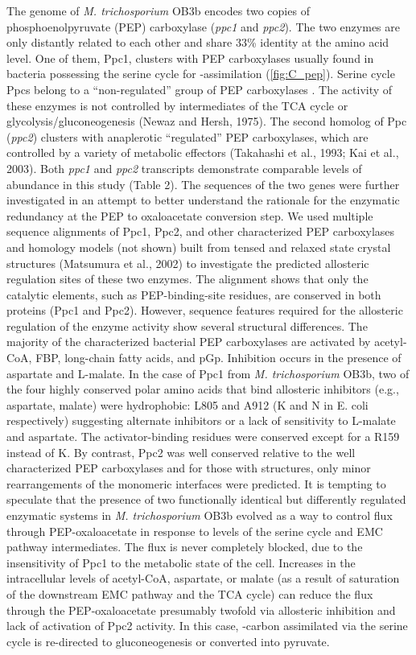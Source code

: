 The genome of \textit{M. trichosporium} OB3b encodes two copies of phosphoenolpyruvate (PEP) carboxylase (\textit{ppc1} and \textit{ppc2}).
The two enzymes are only distantly related to each other and share 33\% identity at the amino acid level.
One of them, Ppc1, clusters with PEP carboxylases usually found in bacteria possessing the serine cycle for -assimilation (\ref{fig:C_pep}).
Serine cycle Ppcs belong to a “non-regulated” group of PEP carboxylases \cite{anthony1982}.
The activity of these enzymes is not controlled by intermediates of the TCA cycle or glycolysis/gluconeogenesis (Newaz and Hersh, 1975).
The second homolog of Ppc (\textit{ppc2}) clusters with anaplerotic “regulated” PEP carboxylases, which are controlled by a variety of metabolic effectors (Takahashi et al., 1993; Kai et al., 2003).
Both \textit{ppc1} and \textit{ppc2} transcripts demonstrate comparable levels of abundance in this study (Table 2).
The sequences of the two genes were further investigated in an attempt to better understand the rationale for the enzymatic redundancy at the PEP to oxaloacetate conversion step.
We used multiple sequence alignments of Ppc1, Ppc2, and other characterized PEP carboxylases and homology models (not shown) built from tensed and relaxed state crystal structures (Matsumura et al., 2002) to investigate the predicted allosteric regulation sites of these two enzymes.
The alignment shows that only the catalytic elements, such as PEP-binding-site residues, are conserved in both proteins (Ppc1 and Ppc2). %
However, sequence features required for the allosteric regulation of the enzyme activity show several structural differences.
The majority of the characterized bacterial PEP carboxylases are activated by acetyl-CoA, FBP, long-chain fatty acids, and pGp.
Inhibition occurs in the presence of aspartate and L-malate.
In the case of Ppc1 from \textit{M. trichosporium} OB3b, two of the four highly conserved polar amino acids that bind allosteric inhibitors (e.g., aspartate, malate) were hydrophobic: L805 and A912 (K and N in E. coli respectively) suggesting alternate inhibitors or a lack of sensitivity to L-malate and aspartate.
The activator-binding residues were conserved except for a R159 instead of K.
By contrast, Ppc2 was well conserved relative to the well characterized PEP carboxylases and for those with structures, only minor rearrangements of the monomeric interfaces were predicted.
It is tempting to speculate that the presence of two functionally identical but differently regulated enzymatic systems in \textit{M. trichosporium} OB3b evolved as a way to control flux through PEP-oxaloacetate in response to levels of the serine cycle and EMC pathway intermediates.
The flux is never completely blocked, due to the insensitivity of Ppc1 to the metabolic state of the cell.
Increases in the intracellular levels of acetyl-CoA, aspartate, or malate (as a result of saturation of the downstream EMC pathway and the TCA cycle) can reduce the flux through the PEP-oxaloacetate presumably twofold via allosteric inhibition and lack of activation of Ppc2 activity.
In this case, -carbon assimilated via the serine cycle is re-directed to gluconeogenesis or converted into pyruvate.


